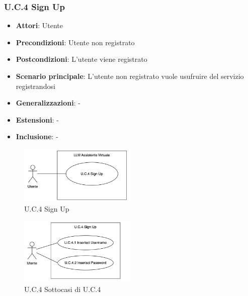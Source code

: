 \subsubsection{U.C.4 Sign Up}
\begin{itemize}
    \item \textbf{Attori}: Utente
    \item \textbf{Precondizioni}: Utente non registrato
    \item \textbf{Postcondizioni}: L'utente viene registrato
    \item \textbf{Scenario principale}: L’utente non registrato vuole usufruire del servizio registrandosi
    \item \textbf{Generalizzazioni}: -
    \item \textbf{Estensioni}: -
    \item \textbf{Inclusione}: -
\end{itemize}
\begin{figure}[h!]
    \centering
    \includegraphics[width=0.5\textwidth]{img/UC4.png}
    \caption{U.C.4 Sign Up}
\end{figure}
\begin{figure}[h!]
    \centering
    \includegraphics[width=0.5\textwidth]{img/UC4p1.png}
    \caption{U.C.4 Sottocasi di U.C.4}
\end{figure}
\newpage

